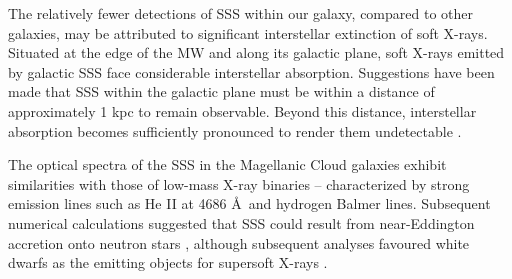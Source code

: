     
    
    The relatively fewer detections of SSS within our galaxy, compared to other galaxies, may be attributed to significant interstellar extinction of soft X-rays. Situated at the edge of the MW and along its galactic plane, soft X-rays emitted by galactic SSS face considerable interstellar absorption. Suggestions have been made that SSS within the galactic plane must be within a distance of approximately 1 kpc to remain observable. Beyond this distance, interstellar absorption becomes sufficiently pronounced to render them undetectable \cite{van1992accreting}.
    
    The optical spectra of the SSS in the Magellanic Cloud galaxies exhibit similarities with those of low-mass X-ray binaries -- characterized by strong emission lines such as He II at 4686 \AA\ and hydrogen Balmer lines. Subsequent numerical calculations suggested that SSS could result from near-Eddington accretion onto neutron stars \cite{kylafis93}, although subsequent analyses favoured white dwarfs as the emitting objects for supersoft X-rays \cite{vandenHeuvel92}.
    
